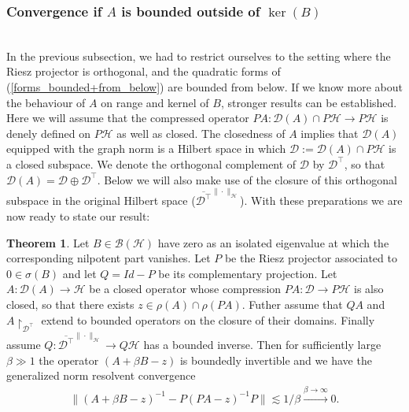 \documentclass[reqno,12pt,letterpaper]{amsart}
\numberwithin{equation}{section}
\newcommand{\1}{\mathds{1}}
\theoremstyle{definition}
\newtheorem{Thm}[Th]{Theorem}
\begin{document}
\subsubsection{Convergence if $A$ is bounded outside of  $\ker(B)$}\label{nice_interaction}\ \\

\noindent In the previous subsection, we had to restrict ourselves to the setting where the Riesz projector is orthogonal, and the quadratic forms of (\ref{forms_bounded+from_below}) are bounded from below.
If we know more about the behaviour of $A$ on range and kernel of  $B$, stronger results can be established. Here we will assume that the compressed operator $PA: \mathcal{D}(A) \cap P\mathcal{H} \rightarrow P\mathcal{H}$ is denely defined on $P\mathcal{H}$ as well as closed. The closedness of $A$ implies that $\mathcal{D}(A)$ equipped with the graph norm is a Hilbert space in which $\mathcal{D} := \mathcal{D}(A) \cap P\mathcal{H} $ is a closed subspace. We denote the orthogonal complement of $\mathcal{D}$ by $\mathcal{D}^\intercal$, so that $ \mathcal{D}(A) = \mathcal{D} \oplus   \mathcal{D}^\intercal$. Below we will also make use of the closure  of this orthogonal subspace in the original Hilbert space ($\overline{\mathcal{D}^\intercal}^{\|\cdot\|_{\mathcal{H}}}$).
With these preparations we are now ready to state our result:




\begin{Thm}\label{thm_bounded_on_range} 
	Let $B \in \mathcal{B}(\mathcal{H})$ have zero as an isolated eigenvalue at which the corresponding nilpotent part vanishes. Let $P$ be the Riesz projector associated to $0 \in \sigma(B)$ and let $Q = Id - P$ be its complementary projection. 	
	Let $A: \mathcal{D}(A) \rightarrow \mathcal{H}$ be a closed operator whose compression $PA: \mathcal{D} \rightarrow P\mathcal{H}$ is also closed, so that there exists  $z \in \rho(A) \cap \rho(PA)$. Futher assume that $QA$ and $A\restriction_{\mathcal{D}^\intercal}$ extend to bounded operators on the closure of their domains. Finally assume $Q: \overline{\mathcal{D}^\intercal}^{\|\cdot\|_{\mathcal{H}}} \rightarrow Q\mathcal{H}$ has a bounded inverse.
	Then for sufficiently large $\beta \gg 1$ the operator $(A + \beta B - z)$ is boundedly invertible and we have the generalized norm resolvent convergence
	\begin{align}\label{convergence_preserved_domain}
		\|(A + \beta B - z)^{-1} - P(PA -z)^{-1}P\| \lesssim 1/\beta \xrightarrow{\beta \rightarrow \infty} 0.
	\end{align}
 \end{Thm}
\end{document}

